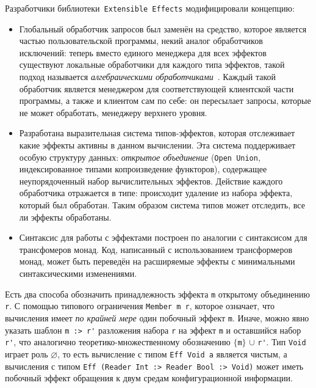 Разработчики библиотеки~\lstinline{Extensible Effects} модифицировали концепцию:

\begin{itemize}
  \item
Глобальный обработчик запросов был заменён на средство, которое является частью 
пользовательской программы, некий аналог обработчиков исключений: теперь вместо 
единого менеджера для всех эффектов существуют локальные обработчики для каждого 
типа эффектов, такой подход называется \emph{алгебраическими
обработчиками}~\cite{effAndHandl}. Каждый такой обработчик является менеджером 
для соответствующей клиентской части программы, а также и клиентом сам по себе: 
он пересылает запросы, которые не может обработать, менеджеру верхнего уровня.
  \item
Разработана выразительная система типов-эффектов, которая отслеживает какие 
эффекты активны в данном вычислении. Эта система поддерживает особую структуру 
данных: \emph{открытое объединение} (\lstinline{Open Union}, индексированное 
типами копроизведение функторов), содержащее неупорядоченный набор 
вычислительных эффектов. Действие каждого обработчика отражается в типе: 
происходит удаление из набора эффекта, который был обработан. Таким 
образом система типов может отследить, все ли эффекты обработаны.
  \item
Синтаксис для работы с эффектами построен по аналогии с синтаксисом для 
трансфомеров монад. Код, написанный с использованием трансформеров монад, 
может быть переведён на расширяемые эффекты с минимальными синтаксическими 
изменениями.
\end{itemize}

Есть два способа обозначить принадлежность эффекта \lstinline{m} открытому 
объединению \lstinline{r}. С помощью типового ограничения 
\mbox{\lstinline{Member m r},} которое означает, что вычисления имеет 
\emph{по крайней мере} один побочный эффект \lstinline{m}. Иначе, можно явно 
указать шаблон \lstinline{m :> r'} разложения набора \lstinline{r} на 
эффект \lstinline{m} и оставшийся набор \lstinline{r'}, что аналогично 
теоретико-множественному обозначению $\{$\lstinline{m}$\}$ $\cup$ 
\lstinline{r'}. Тип \lstinline{Void} играет роль $\varnothing$, то есть 
вычисление с типом \lstinline{Eff Void a} является чистым, а вычисления с 
типом \lstinline{Eff (Reader Int :> Reader Bool :> Void)} может иметь побочный 
эффект обращения к двум средам конфигурационной информации.


